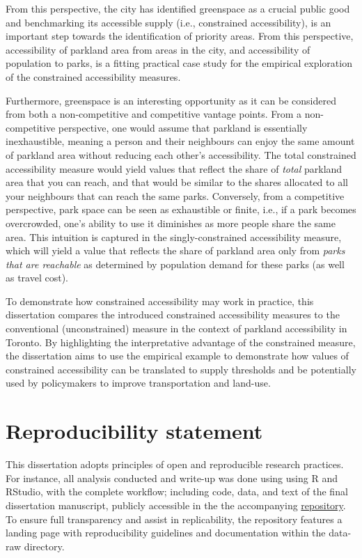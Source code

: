 \documentclass[
11pt, %
oneside, %
english, %
singlespacing, %
]{macthesis} %
\begin{document}
From this perspective, the city has identified greenspace as a crucial public good and benchmarking its accessible supply (i.e., constrained accessibility), is an important step towards the identification of priority areas. From this perspective, accessibility of parkland area from areas in the city, and accessibility of population to parks, is a fitting practical case study for the empirical exploration of the constrained accessibility measures.

Furthermore, greenspace is an interesting opportunity as it can be considered from both a non-competitive and competitive vantage points. From a non-competitive perspective, one would assume that parkland is essentially inexhaustible, meaning a person and their neighbours can enjoy the same amount of parkland area without reducing each other's accessibility. The total constrained accessibility measure would yield values that reflect the share of \emph{total} parkland area that you can reach, and that would be similar to the shares allocated to all your neighbours that can reach the same parks. Conversely, from a competitive perspective, park space can be seen as exhaustible or finite, i.e., if a park becomes overcrowded, one's ability to use it diminishes as more people share the same area. This intuition is captured in the singly-constrained accessibility measure, which will yield a value that reflects the share of parkland area only from \emph{parks that are reachable} as determined by population demand for these parks (as well as travel cost).

To demonstrate how constrained accessibility may work in practice, this dissertation compares the introduced constrained accessibility measures to the conventional (unconstrained) measure in the context of parkland accessibility in Toronto. By highlighting the interpretative advantage of the constrained measure, the dissertation aims to use the empirical example to demonstrate how values of constrained accessibility can be translated to supply thresholds and be potentially used by policymakers to improve transportation and land-use.

\section{Reproducibility statement}\label{reproducibility-statement}

This dissertation adopts principles of open and reproducible research practices. For instance, all analysis conducted and write-up was done using using R and RStudio, with the complete workflow; including code, data, and text of the final dissertation manuscript, publicly accessible in the the accompanying \href{https://github.com/soukhova/Dissertation}{repository}. To ensure full transparency and assist in replicability, the repository features a landing page with reproducibility guidelines and documentation within the data-raw directory.
\end{document}
